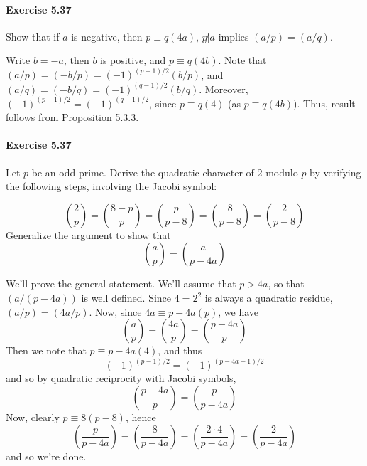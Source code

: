 \documentclass[notitlepage]{article}
\theoremstyle{definition}
\begin{document}
\paragraph{Exercise 5.37}
Show that if $a$ is negative, then $p \equiv q (4a)$, $p \not | a$ implies $(a/p) = (a/q)$.

Write $b = -a$, then $b$ is positive, and $p \equiv q (4b)$. Note that
$(a/p) = (-b/p) = (-1)^{(p-1)/2} (b/p)$, and $(a/q) = (-b/q) =
(-1)^{(q-1)/2} (b/q)$. Moreover, $(-1)^{(p-1)/2} = (-1)^{(q-1)/2}$,
since $p \equiv q (4)$ (as $p \equiv q (4b)$). Thus, result follows
from Proposition 5.3.3.

\paragraph{Exercise 5.37}
Let $p$ be an odd prime. Derive the quadratic character of $2$ modulo
$p$ by verifying the following steps, involving the Jacobi symbol:

\begin{equation}
  \left(\frac{2}{p}\right) = \left(\frac{8-p}{p}\right) =
  \left(\frac{p}{p-8}\right) = \left(\frac{8}{p-8}\right) =
  \left(\frac{2}{p-8}\right)
\end{equation}
Generalize the argument to show that
\begin{equation}
  \left(\frac{a}{p}\right) = \left(\frac{a}{p-4a}\right)
\end{equation}

We'll prove the general statement. We'll assume that $p > 4a$, so that
$(a/(p-4a))$ is well defined. Since $4 = 2^2$ is always a quadratic
residue, $(a/p) = (4a/p)$. Now, since $4a \equiv p-4a (p)$, we have
\begin{equation}
  \left(\frac{a}{p}\right) = \left(\frac{4a}{p}\right) =
  \left(\frac{p-4a}{p}\right)
\end{equation}
Then we note that $p \equiv p-4a (4)$, and thus
\begin{equation}
  (-1)^{(p-1)/2} = (-1)^{(p-4a-1)/2}
\end{equation}
and so by quadratic reciprocity with Jacobi symbols,
\begin{equation}
  \left(\frac{p-4a}{p}\right) = \left(\frac{p}{p-4a}\right)
\end{equation}
Now, clearly $p \equiv 8 (p-8)$, hence
\begin{equation}
\left(\frac{p}{p-4a}\right) = \left(\frac{8}{p-4a}\right) =
\left(\frac{2 \cdot 4}{p-4a}\right) = \left(\frac{2}{p-4a}\right)
\end{equation}
and so we're done.
\end{document}
